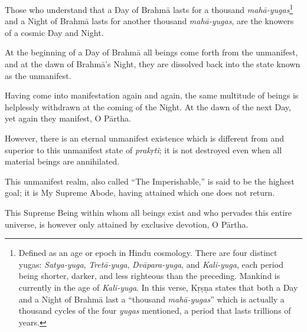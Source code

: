 {Those who understand that a Day of Brahmā lasts for a thousand \textit{mahā-yugas}\footnote{Defined as an age or epoch in Hindu cosmology. There are four distinct yugas: \textit{Satya-yuga}, \textit{Tretā-yuga}, \textit{Dvāpara-yuga}, and \textit{Kali-yuga}, each period being shorter, darker, and less righteous than the preceding. Mankind is currently in the age of \textit{Kali-yuga}. In this verse, Kṛṣṇa states that both a Day and a Night of Brahmā last a \enquote{thousand \textit{mahā-yugas}} which is actually a thousand cycles of the four \textit{yugas} mentioned, a period that lasts trillions of years.} and a Night of Brahmā lasts for another thousand \textit{mahā-yugas}, are the knowers of a cosmic Day and Night.}

{At the beginning of a Day of Brahmā all beings come forth from the unmanifest, and at the dawn of Brahmā's Night, they are dissolved back into the state known as the unmanifest.}

{Having come into manifestation again and again, the same multitude of beings is helplessly withdrawn at the coming of the Night. At the dawn of the next Day, yet again they manifest, O Pārtha.}

{However, there is an eternal unmanifest existence which is different from and superior to this unmanifest state of \textit{prakṛti}; it is not destroyed even when all material beings are annihilated.}

{This unmanifest realm, also called \enquote{The Imperishable,} is said to be the highest goal; it is My Supreme Abode, having attained which one does not return.}

{This Supreme Being within whom all beings exist and who pervades this entire universe, is however only attained by exclusive devotion, O Pārtha.}


